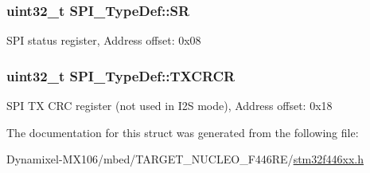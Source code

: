\subsubsection[{\texorpdfstring{SR}{SR}}]{ uint32\+\_\+t S\+P\+I\+\_\+\+Type\+Def\+::\+SR}\hypertarget{struct_s_p_i___type_def_a33f3dd6a505d06fe6c466b63be451891}{}\label{struct_s_p_i___type_def_a33f3dd6a505d06fe6c466b63be451891}
S\+PI status register, Address offset\+: 0x08 
\subsubsection[{\texorpdfstring{T\+X\+C\+R\+CR}{TXCRCR}}]{ uint32\+\_\+t S\+P\+I\+\_\+\+Type\+Def\+::\+T\+X\+C\+R\+CR}\hypertarget{struct_s_p_i___type_def_a0b5a7f6383eb478bbcc22a36c5e95ae6}{}\label{struct_s_p_i___type_def_a0b5a7f6383eb478bbcc22a36c5e95ae6}
S\+PI TX C\+RC register (not used in I2S mode), Address offset\+: 0x18 

The documentation for this struct was generated from the following file\+:\begin{DoxyCompactItemize}
\item 
Dynamixel-\/\+M\+X106/mbed/\+T\+A\+R\+G\+E\+T\+\_\+\+N\+U\+C\+L\+E\+O\+\_\+\+F446\+R\+E/\hyperlink{stm32f446xx_8h}{stm32f446xx.\+h}\end{DoxyCompactItemize}
